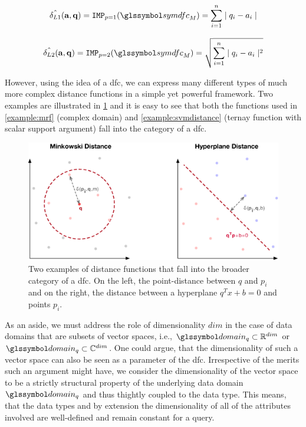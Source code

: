 \begin{equation}
    \hat{\delta_{L1}}(\mathbf{a},\mathbf{q}) = \texttt{IMP}_{p=1}(\symdfc_M) = \sum_{i=1}^{n} \mid q_i - a_i \mid
\end{equation}

\begin{equation}
    \hat{\delta_{L2}}(\mathbf{a},\mathbf{q}) = \texttt{IMP}_{p=2}(\symdfc_M) = \sqrt{\sum_{i=1}^{n} \mid q_i - a_i \mid^2}
\end{equation}

However, using the idea of a \acrshort{dfc}, we can express many different types of much more complex distance functions in a simple yet powerful framework. Two examples are illustrated in \cref{figure:distance_computation} and it is easy to see that both the functions used in \cref{example:mrf} (complex domain) and \cref{example:svmdistance} (ternay function with scalar support argument) fall into the category of a \acrshort{dfc}.

\begin{figure}[bt]
    \centering
    \includegraphics[width=\textwidth]{figures/distance_computations.eps}
    \caption{Two examples of distance functions that fall into the broader category of a \acrshort{dfc}. On the left, the point-distance between $q$ and $p_i$ and on the right, the distance between a hyperplane $q^Tx+b = 0$ and points $p_i$.}
    \label{figure:distance_computation}
\end{figure}

As an aside, we must address the role of dimensionality $dim$ in the case of data domains that are subsets of vector spaces, i.e.,  $\domain_q \subset \mathbb{R}^{dim}$ or $\domain_q \subset \mathbb{C}^{dim}$. One could argue, that the dimensionality of such a vector space can also be seen as a parameter of the \acrshort{dfc}. Irrespective of the merits such an argument might have, we consider the dimensionality of the vector space to be a strictly structural property of the underlying data domain $\domain_q$ and thus thightly coupled to the data type. This means, that the data types and by extension the dimensionality of all of the attributes involved are well-defined and remain constant for a query.

